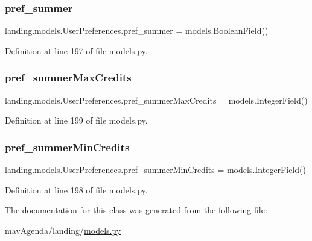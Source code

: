 \subsubsection{\texorpdfstring{pref\+\_\+summer}{pref\_summer}}
{\footnotesize\ttfamily landing.\+models.\+User\+Preferences.\+pref\+\_\+summer = models.\+Boolean\+Field()\hspace{0.3cm}{\ttfamily [static]}}



Definition at line 197 of file models.\+py.

\mbox{\label{classlanding_1_1models_1_1UserPreferences_aa092d2329abff89f22e57a07959ddad5}} 
\subsubsection{\texorpdfstring{pref\+\_\+summer\+Max\+Credits}{pref\_summerMaxCredits}}
{\footnotesize\ttfamily landing.\+models.\+User\+Preferences.\+pref\+\_\+summer\+Max\+Credits = models.\+Integer\+Field()\hspace{0.3cm}{\ttfamily [static]}}



Definition at line 199 of file models.\+py.

\mbox{\label{classlanding_1_1models_1_1UserPreferences_a48d4f7a3be77d9bbc0b1a40cf8e993ce}} 
\subsubsection{\texorpdfstring{pref\+\_\+summer\+Min\+Credits}{pref\_summerMinCredits}}
{\footnotesize\ttfamily landing.\+models.\+User\+Preferences.\+pref\+\_\+summer\+Min\+Credits = models.\+Integer\+Field()\hspace{0.3cm}{\ttfamily [static]}}



Definition at line 198 of file models.\+py.



The documentation for this class was generated from the following file\+:\begin{DoxyCompactItemize}
\item 
mav\+Agenda/landing/\mbox{\hyperlink{models_8py}{models.\+py}}\end{DoxyCompactItemize}
